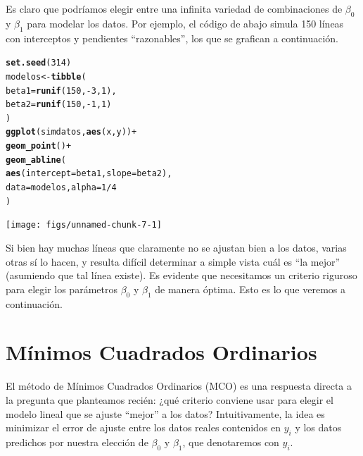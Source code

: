\documentclass[12pt]{report}\usepackage[]{graphicx}\usepackage[]{color}
\makeatletter
\newcommand{\hlnum}[1]{\textcolor[rgb]{0.686,0.059,0.569}{#1}}%
\newcommand{\hlopt}[1]{\textcolor[rgb]{0,0,0}{#1}}%
\newcommand{\hlstd}[1]{\textcolor[rgb]{0.345,0.345,0.345}{#1}}%
\newcommand{\hlkwb}[1]{\textcolor[rgb]{0.69,0.353,0.396}{#1}}%
\newcommand{\hlkwc}[1]{\textcolor[rgb]{0.333,0.667,0.333}{#1}}%
\newcommand{\hlkwd}[1]{\textcolor[rgb]{0.737,0.353,0.396}{\textbf{#1}}}%
\newenvironment{kframe}{%
 \def\at@end@of@kframe{}%
 \ifinner\ifhmode%
  \def\at@end@of@kframe{\end{minipage}}%
  \begin{minipage}{\columnwidth}%
 \fi\fi%
 \def\FrameCommand##1{\hskip\@totalleftmargin \hskip-\fboxsep
 \colorbox{shadecolor}{##1}\hskip-\fboxsep
     \hskip-\linewidth \hskip-\@totalleftmargin \hskip\columnwidth}%
 \MakeFramed {\advance\hsize-\width
   \@totalleftmargin\z@ \linewidth\hsize
   \@setminipage}}%
 {\par\unskip\endMakeFramed%
 \at@end@of@kframe}
\newenvironment{knitrout}{}{} %
\makeatother
\begin{document}
Es claro que podríamos elegir entre una infinita variedad de combinaciones de $\beta_0$ y $\beta_1$ para modelar los datos. Por ejemplo, el código de abajo simula 150 líneas con interceptos y pendientes ``razonables'', los que se grafican a continuación.

\begin{knitrout}
\color{fgcolor}\begin{kframe}
\begin{alltt}
\hlkwd{set.seed}\hlstd{(}\hlnum{314}\hlstd{)}
\hlstd{modelos} \hlkwb{<-} \hlkwd{tibble}\hlstd{(}
  \hlkwc{beta1} \hlstd{=} \hlkwd{runif}\hlstd{(}\hlnum{150}\hlstd{,} \hlopt{-}\hlnum{3}\hlstd{,} \hlnum{1}\hlstd{),}
  \hlkwc{beta2} \hlstd{=} \hlkwd{runif}\hlstd{(}\hlnum{150}\hlstd{,} \hlopt{-}\hlnum{1}\hlstd{,} \hlnum{1}\hlstd{)}
  \hlstd{)}
\hlkwd{ggplot}\hlstd{(simdatos,} \hlkwd{aes}\hlstd{(x, y))} \hlopt{+}
  \hlkwd{geom_point}\hlstd{()} \hlopt{+}
  \hlkwd{geom_abline}\hlstd{(}
    \hlkwd{aes}\hlstd{(}\hlkwc{intercept} \hlstd{= beta1,} \hlkwc{slope} \hlstd{= beta2),}
    \hlkwc{data} \hlstd{= modelos,} \hlkwc{alpha} \hlstd{=} \hlnum{1}\hlopt{/}\hlnum{4}
  \hlstd{)}
\end{alltt}
\end{kframe}

{\centering \texttt{[image: figs/unnamed-chunk-7-1]} 

}



\end{knitrout}

Si bien hay muchas líneas que claramente no se ajustan bien a los datos, varias otras sí lo hacen, y resulta difícil determinar a simple vista cuál es ``la mejor'' (asumiendo que tal línea existe).
Es evidente que necesitamos un criterio riguroso para elegir los parámetros $\beta_0$ y $\beta_1$ de manera óptima.
Esto es lo que veremos a continuación.


\section{Mínimos Cuadrados Ordinarios}
\label{sec:MCO}

El método de Mínimos Cuadrados Ordinarios (MCO) es una respuesta directa a la pregunta que planteamos recién: ¿qué criterio conviene usar para elegir el modelo lineal que se ajuste ``mejor'' a los datos?
Intuitivamente, la idea es minimizar el error de ajuste entre los datos reales contenidos en $y_i$ y los datos predichos por nuestra elección de $\beta_0$ y $\beta_1$, que denotaremos con $\hat y_i$.
\end{document}
